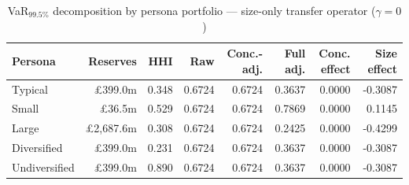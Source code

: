 \begin{table}[htbp]
\centering
\caption{VaR$_{99.5\%}$ decomposition by persona portfolio --- size-only transfer operator ($\gamma=0$)}
\label{tab:var_decomposition_personas}
\begin{tabular}{lrrrrrr r}
\toprule
\textbf{Persona} & \textbf{Reserves} & \textbf{HHI} & \textbf{Raw} & \textbf{Conc.-adj.} & \textbf{Full adj.} & \textbf{Conc. effect} & \textbf{Size effect} \\
\midrule
Typical & \pounds399.0m & 0.348 & 0.6724 & 0.6724 & 0.3637 & 0.0000 & -0.3087 \\
Small & \pounds36.5m & 0.529 & 0.6724 & 0.6724 & 0.7869 & 0.0000 & 0.1145 \\
Large & \pounds2,687.6m & 0.308 & 0.6724 & 0.6724 & 0.2425 & 0.0000 & -0.4299 \\
Diversified & \pounds399.0m & 0.231 & 0.6724 & 0.6724 & 0.3637 & 0.0000 & -0.3087 \\
Undiversified & \pounds399.0m & 0.890 & 0.6724 & 0.6724 & 0.3637 & 0.0000 & -0.3087 \\
\bottomrule
\end{tabular}
\end{table}
